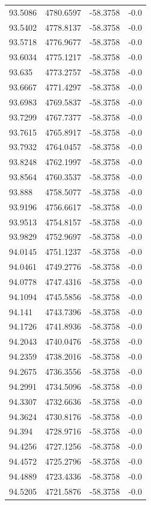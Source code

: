 \begin{table}[H]
\begin{tabular}{llll}
93.5086 & 4780.6597 & -58.3758 & -0.0 \\
93.5402 & 4778.8137 & -58.3758 & -0.0 \\
93.5718 & 4776.9677 & -58.3758 & -0.0 \\
93.6034 & 4775.1217 & -58.3758 & -0.0 \\
93.635 & 4773.2757 & -58.3758 & -0.0 \\
93.6667 & 4771.4297 & -58.3758 & -0.0 \\
93.6983 & 4769.5837 & -58.3758 & -0.0 \\
93.7299 & 4767.7377 & -58.3758 & -0.0 \\
93.7615 & 4765.8917 & -58.3758 & -0.0 \\
93.7932 & 4764.0457 & -58.3758 & -0.0 \\
93.8248 & 4762.1997 & -58.3758 & -0.0 \\
93.8564 & 4760.3537 & -58.3758 & -0.0 \\
93.888 & 4758.5077 & -58.3758 & -0.0 \\
93.9196 & 4756.6617 & -58.3758 & -0.0 \\
93.9513 & 4754.8157 & -58.3758 & -0.0 \\
93.9829 & 4752.9697 & -58.3758 & -0.0 \\
94.0145 & 4751.1237 & -58.3758 & -0.0 \\
94.0461 & 4749.2776 & -58.3758 & -0.0 \\
94.0778 & 4747.4316 & -58.3758 & -0.0 \\
94.1094 & 4745.5856 & -58.3758 & -0.0 \\
94.141 & 4743.7396 & -58.3758 & -0.0 \\
94.1726 & 4741.8936 & -58.3758 & -0.0 \\
94.2043 & 4740.0476 & -58.3758 & -0.0 \\
94.2359 & 4738.2016 & -58.3758 & -0.0 \\
94.2675 & 4736.3556 & -58.3758 & -0.0 \\
94.2991 & 4734.5096 & -58.3758 & -0.0 \\
94.3307 & 4732.6636 & -58.3758 & -0.0 \\
94.3624 & 4730.8176 & -58.3758 & -0.0 \\
94.394 & 4728.9716 & -58.3758 & -0.0 \\
94.4256 & 4727.1256 & -58.3758 & -0.0 \\
94.4572 & 4725.2796 & -58.3758 & -0.0 \\
94.4889 & 4723.4336 & -58.3758 & -0.0 \\
94.5205 & 4721.5876 & -58.3758 & -0.0 \\

\end{tabular}
\end{table}

